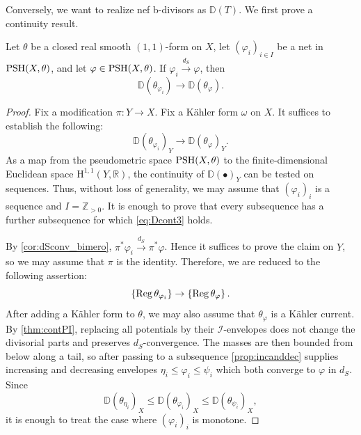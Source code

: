 Conversely, we want to realize nef b-divisors as $\mathbb{D}(T)$. We first prove a continuity result.
\begin{proposition}\label{prop:dscontbdiv}
Let $\theta$ be a closed real smooth $(1,1)$-form on $X$, let $(\varphi_i)_{i\in I}$ be a net in $\mathrm{PSH}(X,\theta)$, and let $\varphi\in \mathrm{PSH}(X,\theta)$. If $\varphi_i\xrightarrow{d_S}\varphi$, then
\begin{equation}\label{eq:Dcont1}
    \mathbb{D}\left(\theta_{\varphi_i}\right)\to \mathbb{D}\left(\theta_{\varphi}\right).
\end{equation}
\end{proposition}
\begin{proof}
    Fix a modification $\pi\colon Y\rightarrow X$.
    Fix a Kähler form $\omega$ on $X$.
    It suffices to establish the following:
    \begin{equation}\label{eq:Dcont2}
    \mathbb{D}\left(\theta_{\varphi_i}\right)_Y\to \mathbb{D}\left(\theta_{\varphi}\right)_Y.
    \end{equation}
    As a map from the pseudometric space $\mathrm{PSH}(X,\theta)$ to the finite-dimensional Euclidean space $\mathrm{H}^{1,1}(Y,\mathbb{R})$, the continuity of $\mathbb{D}(\bullet)_Y$ can be tested on sequences. Thus, without loss of generality, we may assume that $(\varphi_i)_i$ is a sequence and $I=\mathbb{Z}_{>0}$. It is enough to prove that every subsequence has a further subsequence for which \eqref{eq:Dcont3} holds.

    By \cref{cor:dSconv_bimero}, $\pi^*\varphi_i\xrightarrow{d_S}\pi^*\varphi$. Hence it suffices to prove the claim on $Y$, so we may assume that $\pi$ is the identity. Therefore, we are reduced to the following assertion:
    \begin{equation}\label{eq:Dcont3}
        \left\{ \operatorname{Reg} \theta_{\varphi_i} \right\}\to \left\{ \operatorname{Reg} \theta_{\varphi} \right\}.
    \end{equation}
    After adding a Kähler form to $\theta$, we may also assume that $\theta_{\varphi}$ is a Kähler current. By \cref{thm:contPI}, replacing all potentials by their $\mathcal{I}$-envelopes does not change the divisorial parts and preserves $d_S$-convergence. The masses are then bounded from below along a tail, so after passing to a subsequence \cref{prop:incanddec} supplies increasing and decreasing envelopes $\eta_i\leq \varphi_i\leq \psi_i$ which both converge to $\varphi$ in $d_S$. Since
    \[
        \mathbb{D}(\theta_{\eta_i})_X\leq \mathbb{D}(\theta_{\varphi_i})_X\leq \mathbb{D}(\theta_{\psi_i})_X,
    \]
    it is enough to treat the case where $(\varphi_i)_i$ is monotone.


\end{proof}
